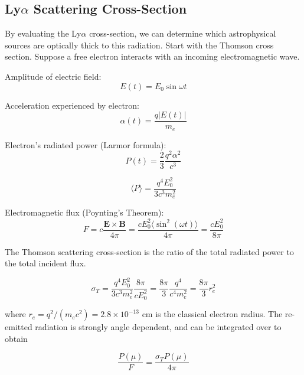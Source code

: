 \documentclass[onecolumn]{aastex63}
\begin{document}
\subsection{Ly$\alpha$ Scattering Cross-Section}

By evaluating the Ly$\alpha$ cross-section, we can determine which astrophysical sources are optically thick to this radiation. Start with the Thomson cross section. Suppose a free electron interacts with an incoming electromagnetic wave. 

\noindent Amplitude of electric field:
\begin{equation}
    E(t) = E_0 \sin{\omega t}
\end{equation}

\noindent Acceleration experienced by electron:
\begin{equation}
    \alpha(t) = \frac{q|E(t)|}{m_e}
\end{equation}

\noindent Electron's radiated power (Larmor formula):
\begin{equation}
    P(t) = \frac{2}{3}\frac{q^2\alpha^2}{c^3}
\end{equation}

\begin{equation}
    \langle P \rangle = \frac{q^4E_0^2}{3c^3m_e^2}
\end{equation}

\noindent Electromagnetic flux (Poynting's Theorem):
\begin{equation}
    F = c\frac{\mathbf{E} \times \mathbf{B}}{4\pi} = \frac{cE_0^2 \langle \sin^2 (\omega t)\rangle}{4\pi} = \frac{cE_0^2}{8\pi}
\end{equation}

\noindent The Thomson scattering cross-section is the ratio of the total radiated power to the total incident flux. 

\begin{equation}
    \sigma_T = \frac{q^4 E_0^2}{3c^3m_e^2} \frac{8\pi}{cE_0^2} = \frac{8\pi}{3}\frac{q^4}{c^4m_e^2} = \frac{8\pi}{3}r_e^2
\end{equation}

where $r_e = q^2 / (m_ec^2)  = 2.8 \times 10^{-13}$ cm is the classical electron radius. The re-emitted radiation is strongly angle dependent, and can be integrated over to obtain

\begin{equation}
    \frac{P(\mu)}{F} = \frac{\sigma_T P(\mu)}{4\pi}
\end{equation}
\end{document}
